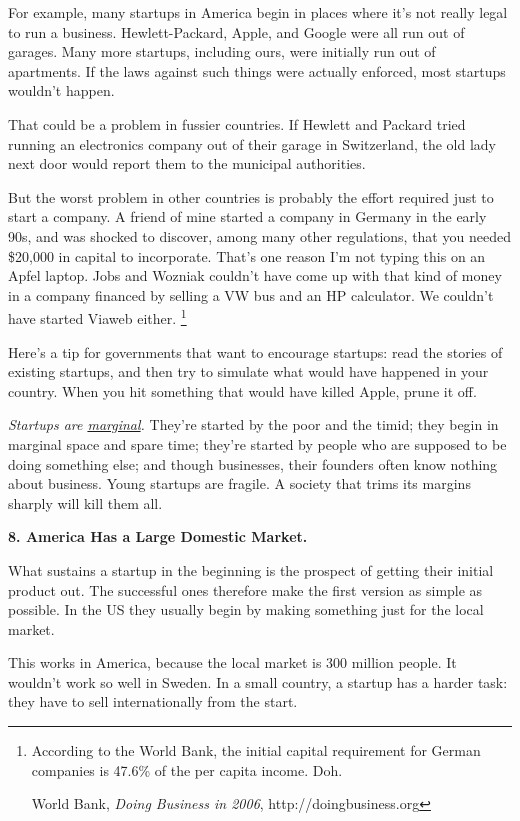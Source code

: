 For example, many startups in America begin in places where it's not
really legal to run a business. Hewlett-Packard, Apple, and Google were
all run out of garages. Many more startups, including ours, were
initially run out of apartments. If the laws against such things were
actually enforced, most startups wouldn't happen.

That could be a problem in fussier countries. If Hewlett and Packard
tried running an electronics company out of their garage in Switzerland,
the old lady next door would report them to the municipal authorities.

But the worst problem in other countries is probably the effort required
just to start a company. A friend of mine started a company in Germany
in the early 90s, and was shocked to discover, among many other
regulations, that you needed \$20,000 in capital to incorporate. That's
one reason I'm not typing this on an Apfel laptop. Jobs and Wozniak
couldn't have come up with that kind of money in a company financed by
selling a VW bus and an HP calculator. We couldn't have started Viaweb
either. \footnote{According to the World Bank, the initial capital requirement for
German companies is 47.6\% of the per capita income. Doh.

World Bank, \emph{Doing Business in 2006}, http://doingbusiness.org}

Here's a tip for governments that want to encourage startups: read the
stories of existing startups, and then try to simulate what would have
happened in your country. When you hit something that would have killed
Apple, prune it off.

\emph{Startups are \href{marginal.html}{marginal}.} They're started by
the poor and the timid; they begin in marginal space and spare time;
they're started by people who are supposed to be doing something else;
and though businesses, their founders often know nothing about business.
Young startups are fragile. A society that trims its margins sharply
will kill them all.

\textbf{8. America Has a Large Domestic Market.}

What sustains a startup in the beginning is the prospect of getting
their initial product out. The successful ones therefore make the first
version as simple as possible. In the US they usually begin by making
something just for the local market.

This works in America, because the local market is 300 million people.
It wouldn't work so well in Sweden. In a small country, a startup has a
harder task: they have to sell internationally from the start.

